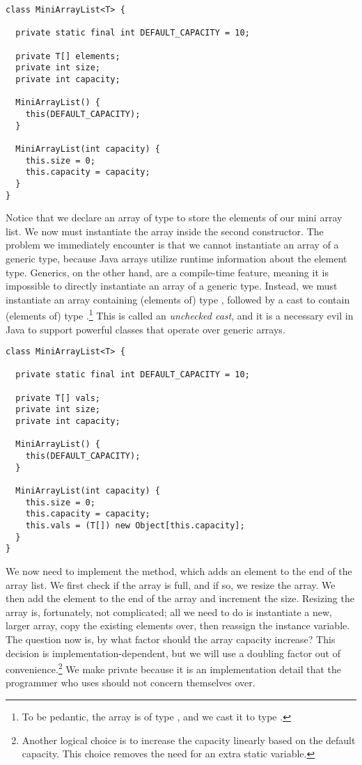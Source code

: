 \begin{lstlisting}[language=MyJava]
class MiniArrayList<T> {

  private static final int DEFAULT_CAPACITY = 10;

  private T[] elements;
  private int size;
  private int capacity;

  MiniArrayList() { 
    this(DEFAULT_CAPACITY); 
  }

  MiniArrayList(int capacity) {
    this.size = 0;
    this.capacity = capacity;
  }
}
\end{lstlisting}

Notice that we declare an array of type  to store the elements of our mini array list. We now must instantiate the array inside the second constructor. 
The problem we immediately encounter is that we cannot instantiate an array of a generic type, because Java arrays utilize runtime information about the element type. 
Generics, on the other hand, are a compile-time feature, meaning it is impossible to directly instantiate an array of a generic type. 
Instead, we must instantiate an array containing (elements of) type , followed by a cast to contain (elements of) type .\footnote{To be pedantic, the array is of type , and we cast it to type .} 
This is called an \emph{unchecked cast}, and it is a necessary evil in Java to support powerful classes that operate over generic arrays.

\begin{lstlisting}[language=MyJava]
class MiniArrayList<T> {

  private static final int DEFAULT_CAPACITY = 10;

  private T[] vals;
  private int size;
  private int capacity;

  MiniArrayList() { 
    this(DEFAULT_CAPACITY); 
  }

  MiniArrayList(int capacity) {
    this.size = 0;
    this.capacity = capacity;
    this.vals = (T[]) new Object[this.capacity];
  }
}
\end{lstlisting}

We now need to implement the  method, which adds an element to the end of the array list. We first check if the array is full, and if so, we resize the array. We then add the element to the end of the array and increment the size. Resizing the array is, fortunately, not complicated; all we need to do is instantiate a new, larger array, copy the existing elements over, then reassign the instance variable. The question now is, by what factor should the array capacity increase? This decision is implementation-dependent, but we will use a doubling factor out of convenience.\footnote{Another logical choice is to increase the capacity linearly based on the default capacity. This choice removes the need for an extra static variable.} We make  private because it is an implementation detail that the programmer who uses  should not concern themselves over. 

